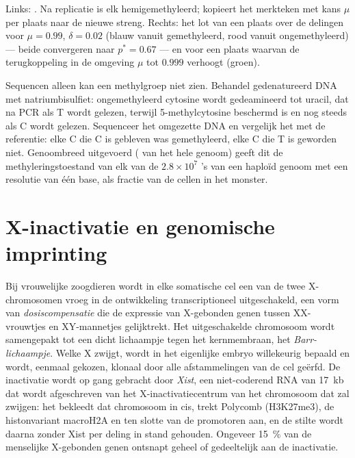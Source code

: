 \begin{omfigure}
{\small Links: . Na replicatie is elk 
hemigemethyleerd;  kopieert het merkteken met kans $\mu$ per
plaats naar de nieuwe streng. Rechts: het lot van een plaats over de
delingen voor $\mu = 0.99$, $\delta = 0.02$ (blauw vanuit gemethyleerd,
rood vanuit ongemethyleerd) --- beide convergeren naar $p^{*} = 0.67$
--- en voor een plaats waarvan de terugkoppeling in de omgeving $\mu$
tot $0.999$ verhoogt (groen).}
\end{omfigure}

\begin{method}\label{met:b3:chromatin-epigenetics:bisulfite}
Sequencen alleen kan een methylgroep niet zien. Behandel gedenatureerd
DNA met natriumbisulfiet: ongemethyleerd cytosine wordt gedeamineerd
tot uracil, dat na PCR als T wordt gelezen, terwijl 5-methylcytosine
beschermd is en nog steeds als C wordt gelezen. Sequenceer het
omgezette DNA en vergelijk het met de referentie: elke C die C is
gebleven was gemethyleerd, elke C die T is geworden niet. Genoombreed
uitgevoerd ( van het hele genoom) geeft dit de
methyleringstoestand van elk van de $2.8\times 10^{7}$ 's van een
haploïd genoom met een resolutie van één base, als fractie van de
cellen in het monster.
\end{method}

\section{X-inactivatie en genomische imprinting}

\begin{definition}\label{def:b3:chromatin-epigenetics:x-inactivation}
Bij vrouwelijke zoogdieren wordt in elke somatische cel een van de
twee X-chromosomen vroeg in de ontwikkeling transcriptioneel
uitgeschakeld, een vorm van \emph{dosiscompensatie} die de expressie
van X-gebonden genen tussen XX-vrouwtjes en XY-mannetjes gelijktrekt.
Het uitgeschakelde chromosoom wordt samengepakt tot een dicht
lichaampje tegen het kernmembraan, het \emph{Barr-lichaampje}. Welke X
zwijgt, wordt in het eigenlijke embryo willekeurig bepaald en wordt,
eenmaal gekozen, klonaal door alle afstammelingen van de cel geërfd.
De inactivatie wordt op gang gebracht door \emph{Xist}, een
niet-coderend RNA van \qty{17}{kb} dat wordt afgeschreven van het
X-inactivatiecentrum van het chromosoom dat zal zwijgen: het bekleedt
dat chromosoom in cis, trekt Polycomb (H3K27me3), de histonvariant
macroH2A en ten slotte  van de promotoren aan, en de
stilte wordt daarna zonder Xist per deling in stand gehouden. Ongeveer
\qty{15}{\%} van de menselijke X-gebonden genen ontsnapt geheel of
gedeeltelijk aan de inactivatie.
\end{definition}

